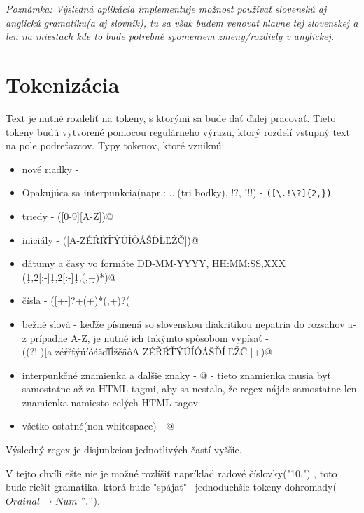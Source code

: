 \documentclass[12pt,a4paper]{report}
\theoremstyle{definition}
\theoremstyle{remark}
\begin{document}
\textit{Poznámka: Výsledná aplikácia implementuje možnosť používať slovenskú aj anglickú gramatiku(a aj slovník), tu sa však budem venovať hlavne tej slovenskej a len na miestach kde to bude potrebné spomeniem zmeny/rozdiely v anglickej.}
\section{Tokenizácia}
Text je nutné rozdeliť na tokeny, s ktorými sa bude dať ďalej pracovať. Tieto tokeny budú vytvorené pomocou regulárneho výrazu, ktorý rozdelí vstupný text na pole podreťazcov.
\noindent Typy tokenov, ktoré vzniknú:
\begin{itemize}
\item nové riadky - \verb@\n@
\item Opakujúca sa interpunkcia(napr.: ...(tri bodky), !?, !!!) - \verb|([\.!\?]{2,})|
\item triedy - \verb@([0-9]\.[A-Z])@ 
\item iniciály - \verb@([A-ZÉŘŔŤÝÚÍÓÁŠĎĹĽŽČ]\.)@
\item dátumy a časy vo formáte DD-MM-YYYY, HH:MM:SS,XXX \\ \verb@(\d{1,2}[:-]\d{1,2}[:-]\d{1,}(,\d+)*)@
\item čísla - \verb@([+-]?\d+(\.\d+)*(,\d+)?(%|,-)?)@ %
\item bežné slová - keďže písmená so slovenskou diakritikou nepatria do rozsahov a-z prípadne A-Z, je nutné ich takýmto spôsobom vypísať - \\ \verb@((?!-)[a-zéŕřťýúíóášďľĺžčäôA-ZÉŘŔŤÝÚÍÓÁŠĎĹĽŽČ-]+)@
\item interpunkčné znamienka a ďalšie znaky - @ - tieto znamienka musia byť samostatne až za HTML tagmi, aby sa nestalo, že regex nájde samostatne len znamienka namiesto celých HTML tagov
\item všetko ostatné(non-whitespace) - \verb@[\S+]@
\end{itemize}

\noindent Výsledný regex je disjunkciou jednotlivých častí vyššie.


V tejto chvíli ešte nie je možné rozlíšiť napríklad radové číslovky("10.") , toto bude riešiť gramatika, ktorá bude "spájať" \ jednoduchšie tokeny dohromady($Ordinal \to Num $ $"."$).
\end{document}
